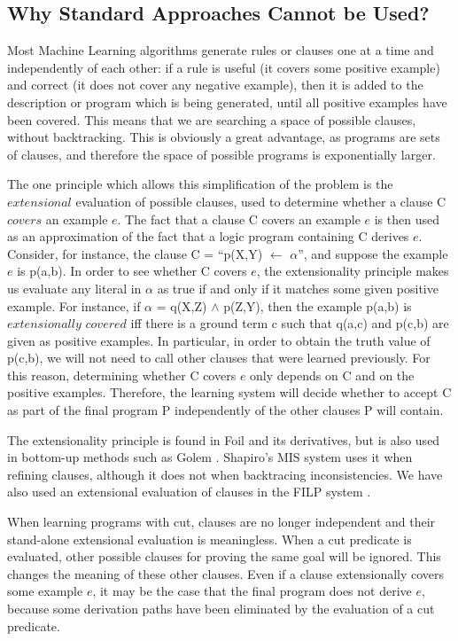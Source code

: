 \subsection{Why Standard Approaches Cannot be Used?}
 
Most Machine Learning algorithms generate rules or
clauses one at a time and independently of each other:
if a rule is useful (it covers some positive example)
and correct (it does not cover any negative example), then
it is added to the description or program which is being
generated, until all positive examples have been covered.
This means that we are
searching a space of possible clauses, without backtracking.
This is obviously a great advantage, as programs are
sets of clauses, and therefore the space of possible programs
is exponentially larger.
 
The one principle which allows this simplification of the problem
is the $extensional$ evaluation of possible clauses, used to
determine whether a clause C $covers$ an example $e$.
The fact that a clause C covers an example $e$ is then
used as an approximation of the fact that a logic program containing
C derives $e$.
Consider, for instance, the clause C = ``p(X,Y) $\leftarrow$ $\alpha$'', 
and suppose the example $e$ is p(a,b).
In order to see whether C covers $e$, the extensionality
principle makes us evaluate any literal in $\alpha$ as
true if and only if it matches some given positive example.
For instance, if
$\alpha$ = q(X,Z) $\wedge$ p(Z,Y),
then the example p(a,b) is $extensionally$
$covered$ iff there is a ground term c such that
q(a,c) and p(c,b) are given as positive examples.
In particular, in order to obtain the truth value of
p(c,b), we will not need to call other clauses
that were learned previously.
For this reason, determining whether C covers $e$ only
depends on C and on the positive examples. Therefore, the
learning system will decide whether to accept C as
part of the final program P independently of the
other clauses P will contain.
 
The extensionality principle is found in Foil \cite{quinmljo90}
and its derivatives, but is also used in bottom-up
methods such as Golem \cite{muggaltc90}. Shapiro's MIS system
\cite{shapbook83} uses it when refining clauses, although
it does not when backtracing inconsistencies.
We have also used an extensional evaluation of clauses 
in the FILP system \cite{bergijca93}.
 
When learning programs with cut, clauses are no longer
independent and their stand-alone extensional evaluation
is meaningless. 
When a cut predicate is evaluated, other possible
clauses for proving the same goal will be ignored.
This changes the meaning of these other clauses.
Even if a clause extensionally covers some example $e$, it
may be the case that the final program does not derive $e$,
because some derivation paths have been eliminated
by the evaluation of a cut predicate.
 
